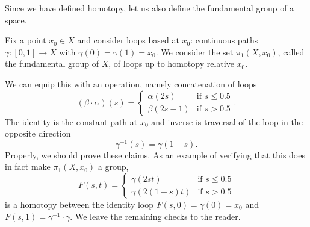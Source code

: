Since we have defined homotopy, let us also define the fundamental group of a space.
\begin{definition}
\label{def:fundamental group}
Fix a point $x_0 \in X$ and consider loops based at $x_0$: continuous paths $\gamma : [0,1] \to X$ with $\gamma(0) = \gamma(1) = x_0$.
We consider the set $\pi_1(X,x_0)$, called the fundamental group of $X$, of loops up to homotopy relative $x_0$.
\end{definition}
We can equip this with an operation, namely concatenation of loops
\[
(\beta \cdot \alpha)(s)
= \begin{cases}
\alpha(2s) & \text{if } s\leq 0.5 \\
\beta(2s-1) & \text{if } s> 0.5
\end{cases}.
\]
The identity is the constant path at $x_0$ and inverse is traversal of the loop in the opposite direction
\[
\gamma^{-1}(s) = \gamma(1-s).
\]
Properly, we should prove these claims.
As an example of verifying that this does in fact make $\pi_1(X,x_0)$ a group, 
\[
F(s,t) = \begin{cases}
\gamma(2st) & \text{if } s\leq 0.5 \\
\gamma(2(1-s)t) & \text{if } s> 0.5
\end{cases}
\]
is a homotopy between the identity loop $F(s,0) = \gamma(0) = x_0$ and $F(s,1) = \gamma^{-1} \cdot \gamma$.
We leave the remaining checks to the reader.

